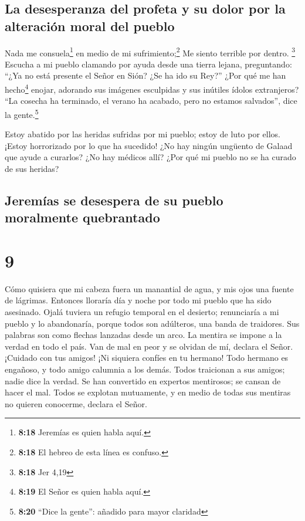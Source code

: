 \hypertarget{la-desesperanza-del-profeta-y-su-dolor-por-la-alteraciuxf3n-moral-del-pueblo}{%
\subsection{La desesperanza del profeta y su dolor por la alteración
moral del
pueblo}\label{la-desesperanza-del-profeta-y-su-dolor-por-la-alteraciuxf3n-moral-del-pueblo}}

 Nada me consuela\footnote{\textbf{8:18} Jeremías es
  quien habla aquí.} en medio de mi sufrimiento;\footnote{\textbf{8:18}
  El hebreo de esta línea es confuso.} Me siento terrible por dentro.
\footnote{\textbf{8:18} Jer 4,19}  Escucha a mi pueblo
clamando por ayuda desde una tierra lejana, preguntando: ``¿Ya no está
presente el Señor en Sión? ¿Se ha ido su Rey?'' ¿Por qué me han
hecho\footnote{\textbf{8:19} El Señor es quien habla aquí.} enojar,
adorando sus imágenes esculpidas y sus inútiles ídolos extranjeros?
 ``La cosecha ha terminado, el verano ha acabado, pero no
estamos salvados'', dice la gente.\footnote{\textbf{8:20} ``Dice la
  gente'': añadido para mayor claridad}

 Estoy abatido por las heridas sufridas por mi pueblo;
estoy de luto por ellos. ¡Estoy horrorizado por lo que ha sucedido!
 ¿No hay ningún ungüento de Galaad que ayude a curarlos?
¿No hay médicos allí? ¿Por qué mi pueblo no se ha curado de sus heridas?

\hypertarget{jeremuxedas-se-desespera-de-su-pueblo-moralmente-quebrantado}{%
\subsection{Jeremías se desespera de su pueblo moralmente
quebrantado}\label{jeremuxedas-se-desespera-de-su-pueblo-moralmente-quebrantado}}

\hypertarget{section-8}{%
\section{9}\label{section-8}}

 Cómo quisiera que mi cabeza fuera un manantial de agua, y
mis ojos una fuente de lágrimas. Entonces lloraría día y noche por todo
mi pueblo que ha sido asesinado.  Ojalá tuviera un refugio
temporal en el desierto; renunciaría a mi pueblo y lo abandonaría,
porque todos son adúlteros, una banda de traidores.  Sus
palabras son como flechas lanzadas desde un arco. La mentira se impone a
la verdad en todo el país. Van de mal en peor y se olvidan de mí,
declara el Señor.  ¡Cuidado con tus amigos! ¡Ni siquiera
confíes en tu hermano! Todo hermano es engañoso, y todo amigo calumnia a
los demás.  Todos traicionan a sus amigos; nadie dice la
verdad. Se han convertido en expertos mentirosos; se cansan de hacer el
mal.  Todos se explotan mutuamente, y en medio de todas
sus mentiras no quieren conocerme, declara el Señor.

